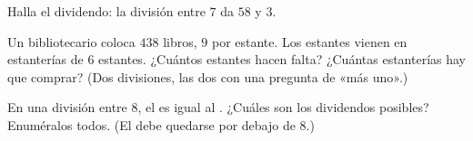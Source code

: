 \begin{exercise}[$\star$]\label{exo:g4:division:9}
Halla el dividendo: la división entre $7$ da  $58$ y
 $3$.
\end{exercise}

\begin{exercise}[$\star\star$]\label{exo:g4:division:10}
Un bibliotecario coloca $438$ libros, $9$ por estante. Los estantes vienen en
estanterías de $6$ estantes. ¿Cuántos estantes hacen falta? ¿Cuántas
estanterías hay que comprar? (Dos divisiones, las dos con una
pregunta de «más uno».)
\end{exercise}

\begin{exercise}[$\star\star$]\label{exo:g4:division:11}
En una división entre $8$, el  es igual al . ¿Cuáles son
los dividendos posibles? Enuméralos todos. (El  debe quedarse
por debajo de $8$.)
\end{exercise}
